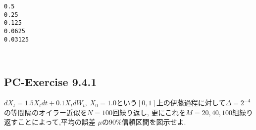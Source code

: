 \documentclass[a4paper,dvipdfmx]{jsarticle}
\newlength{\cellleftmargin}
\newlength{\smallerfontscale}
\def\smaller{\fontsize{\smallerfontscale}{\smallerfontscale}\selectfont}
\begin{document}
\par\vspace{1\smallerfontscale}%
    \begin{addmargin}[\cellleftmargin]{0em}%
    {\smaller%
    \vspace{-1\smallerfontscale}%
    
    \begin{Verbatim}[commandchars=\\\{\}]
0.5
0.25
0.125
0.0625
0.03125

    \end{Verbatim}
}%
    \end{addmargin}%
    \begin{addmargin}[\cellleftmargin]{0em}%
    {\smaller%
    \vspace{-1\smallerfontscale}%
    
    \begin{center}
    \end{center}
    { \hspace*{\fill} \\}
    }%
    \end{addmargin}%
    \subsection{PC-Exercise 9.4.1}\label{pc-exercise-9.4.1}

\(dX_t = 1.5 X_t dt + 0.1 X_t dW_t ,\ X_0 =1.0\)という\([0,1]\)上の伊藤過程に対して\(\Delta= 2^{-4}\)の等間隔のオイラー近似を\(N=100\)回繰り返し,
更にこれを\(M=20,40,100\)組繰り返すことによって,平均の誤差
\(\mu\)の90\%信頼区間を図示せよ.

\end{document}
